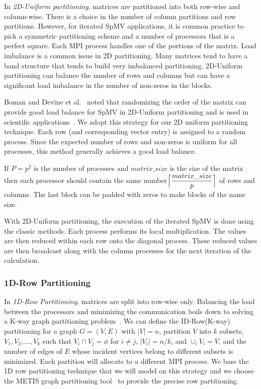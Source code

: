 \documentclass[sigconf,review,anonymous]{acmart}
\begin{document}
In \textit{2D-Uniform partitioning},  matrices
are partitioned into both row-wise and column-wise.  There is a choice
in the number of column partitions and row partitions. However, for
iterated SpMV applications, it is common practice to pick a symmetric
partitioning scheme and a number of processors that is a perfect
square. Each MPI process handles one of the portions of the matrix.
Load imbalance is a common issue in 2D partitioning. Many matrices
tend to have a band structure that tends to build very imbalanced
partitioning.  2D-Uniform partitioning can balance the number of rows
and columns but can have a significant load imbalance in the number
of non-zeros in the blocks.

Boman and Devine et al.~\cite{boman2013scalable} noted that
randomizing the order of the matrix can provide good load balance for
SpMV in 2D-Uniform partitioning and is used in scientific
applications~\cite{dytrych2016efficacy}. We adopt this strategy for
our 2D uniform partitioning technique. Each row (and corresponding
vector entry) is assigned to a random process.  Since the expected
number of rows and non-zeros is uniform for all processes, this method
generally achieves a good load balance.

If $P=p^2$ is the number of processes
and $matrix\_size$ is the size of the matrix then each processor
should contain the same
number$\Bigl\lceil\dfrac{matrix\_size}{p}\Bigr\rceil$ of rows and
columns. The last block can be padded with zeros to make blocks of the name size.

With 2D-Uniform partitioning, the execution of the iterated SpMV is
done using the classic methods. Each process performs its local
multiplication. The values are then reduced within each row onto the
diagonal process. These reduced values are then broadcast along with the
column processes for the next iteration of the calculation.

\subsubsection{1D-Row Partitioning}

In \textit{1D-Row Partitioning}, matrices are split into row-wise
only. Balancing the load between the processors and minimizing the
communication boils down to solving a K-way graph partitioning
problem~\cite{kaya2013analysis}.  We can define the ID-Row(K-way)
partitioning for a graph $G=(V,E)$ with $|V|=n$, partition $V$ into
$k$ subsets, $V_1, V_2, \dots, V_k$ such that $V_i \cap V_j=\phi$ for
$i\neq j$, $|V_i| = n/k$, and $\cup_i V_i = V$, and the number of
edges of $E$ whose incident vertices belong to different subsets is
minimized. Each partition will allocate to a different MPI
process. We base the 1D row partitioning technique that we will model
on this strategy and we choose the METIS graph partitioning
tool~\cite{karypis1995multilevel} to provide the precise row
partitioning.
\end{document}
